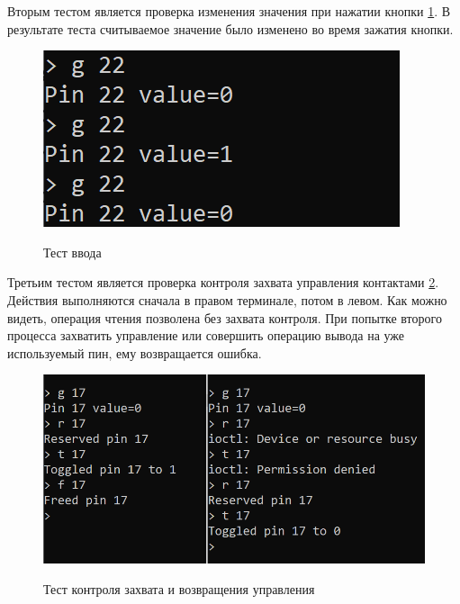 	Вторым тестом является проверка изменения значения при нажатии кнопки \ref{demo:test2}. В результате теста считываемое значение было изменено во время зажатия кнопки.
	
	\begin{figure}[h!] 
		\begin{center}
			{\includegraphics[scale=1.0, angle=0]{img/test2.png}}
			\caption{Тест ввода}
			\label{demo:test2}
		\end{center}
	\end{figure}

	Третьим тестом является проверка контроля захвата управления контактами \ref{demo:test3}. Действия выполняются сначала в правом терминале, потом в левом. Как можно видеть, операция чтения позволена без захвата контроля. При попытке второго процесса захватить управление или совершить операцию вывода на уже используемый пин, ему возвращается ошибка.
	
	\begin{figure}[h!] 
		\begin{center}
			{\includegraphics[scale=1.0, angle=0]{img/test3.png}}
			\caption{Тест контроля захвата и возвращения управления}
			\label{demo:test3}
		\end{center}
	\end{figure}

\pagebreak